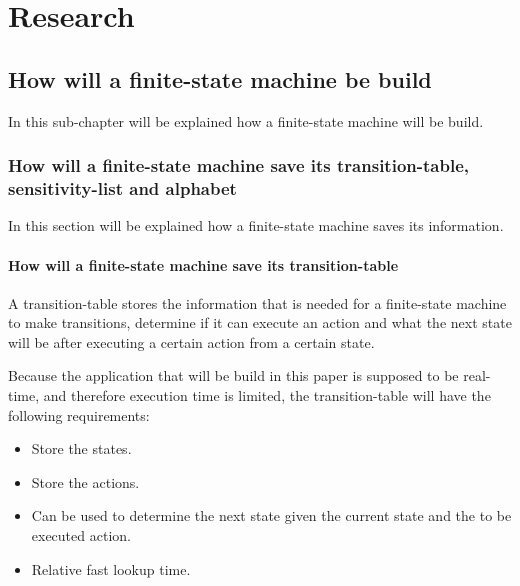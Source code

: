 \hypertarget{research}{%
\section{Research}\label{research}}

\hypertarget{how-will-a-finite-state-machine-be-build}{%
\subsection{How will a finite-state machine be
build}\label{how-will-a-finite-state-machine-be-build}}

In this sub-chapter will be explained how a finite-state machine will be
build.

\hypertarget{how-will-a-finite-state-machine-save-its-transition-table-sensitivity-list-and-alphabet}{%
\subsubsection{How will a finite-state machine save its
transition-table, sensitivity-list and
alphabet}\label{how-will-a-finite-state-machine-save-its-transition-table-sensitivity-list-and-alphabet}}

In this section will be explained how a finite-state machine saves its
information.

\hypertarget{how-will-a-finite-state-machine-save-its-transition-table}{%
\paragraph{How will a finite-state machine save its
transition-table}\label{how-will-a-finite-state-machine-save-its-transition-table}}

A transition-table stores the information that is needed for a
finite-state machine to make transitions, determine if it can execute an
action and what the next state will be after executing a certain action
from a certain state.

Because the application that will be build in this paper is supposed to
be real-time, and therefore execution time is limited, the
transition-table will have the following requirements:

\begin{itemize}
\tightlist
\item
  Store the states.
\item
  Store the actions.
\item
  Can be used to determine the next state given the current state and
  the to be executed action.
\item
  Relative fast lookup time.
\end{itemize}

